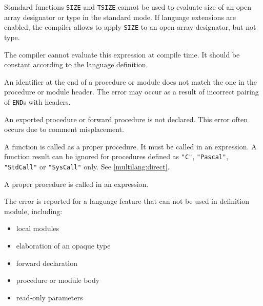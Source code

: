 
Standard functions \verb'SIZE' and \verb'TSIZE' cannot be used to evaluate size of
an open array designator or type in the standard mode. If language
extensions are enabled, the compiler allows to apply \verb'SIZE' to an open
array designator, but not type.


The compiler cannot evaluate this expression at compile time. It should
be constant according to the language definition.


An identifier at the end of a procedure or module does not match the one
in the procedure or module header. The error may occur
as a result of incorrect pairing of \verb'END's with headers.


An exported procedure or forward procedure is not declared.
This error often occurs due to comment misplacement.


A function is called as a proper procedure. It must be called in an
expression. A function result can be ignored for procedures defined
as \verb'"C"', \verb'"Pascal"', \verb'"StdCall"' or \verb'"SysCall"' only.
See \ref{multilang:direct}.


A proper procedure is called in an expression.



The error is reported for a language feature that can not be used in
definition module, including:
\begin{itemize}
\item local modules
\item elaboration of an opaque type
\item forward declaration
\item procedure or module body
\item read-only parameters
\end{itemize}


